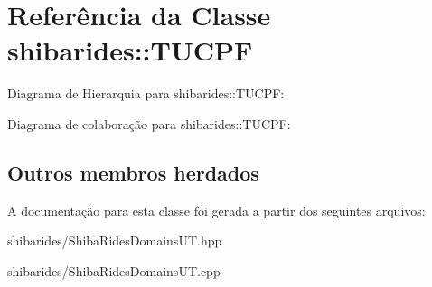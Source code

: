 \hypertarget{classshibarides_1_1TUCPF}{}\section{Referência da Classe shibarides\+:\+:T\+U\+C\+PF}
\label{classshibarides_1_1TUCPF}


Diagrama de Hierarquia para shibarides\+:\+:T\+U\+C\+PF\+:


Diagrama de colaboração para shibarides\+:\+:T\+U\+C\+PF\+:
\subsection*{Outros membros herdados}


A documentação para esta classe foi gerada a partir dos seguintes arquivos\+:\begin{DoxyCompactItemize}
\item 
shibarides/Shiba\+Rides\+Domains\+U\+T.\+hpp\item 
shibarides/Shiba\+Rides\+Domains\+U\+T.\+cpp\end{DoxyCompactItemize}
